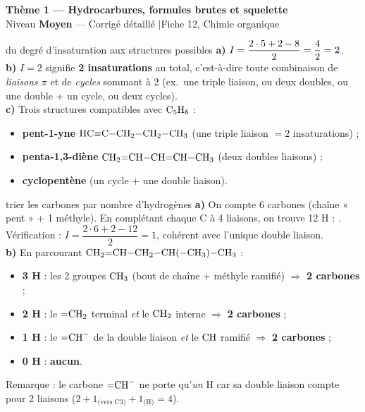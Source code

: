 \documentclass[11pt,a4paper]{article}
\newcommand{\rep}[1]{\textcolor{primarydark}{\textbf{#1}}}
\newcommand{\banner}[2]{%
\begin{tcolorbox}[enhanced,colback=excol,colframe=excol,arc=5pt,boxrule=0pt,
   left=5mm,right=5mm,top=2.5mm,bottom=2.5mm,coltext=white]
{\large\bfseries #1}\\[1pt]{\small #2}
\end{tcolorbox}\vspace{2pt}}
\begin{document}
\banner{Thème 1 — Hydrocarbures, formules brutes et squelette}{Niveau \textbf{Moyen} — Corrigé détaillé \quad$\vert$\quad Fiche 12, Chimie organique}

\begin{corr}{du degré d'insaturation aux structures possibles}
\textbf{a)} $I=\dfrac{2\cdot5+2-8}{2}=\dfrac{4}{2}=\rep{2}$.\\
\textbf{b)} $I=2$ signifie \rep{2 insaturations} au total, c'est-à-dire toute combinaison de \emph{liaisons $\pi$} et de \emph{cycles} sommant à 2 (ex.\ une triple liaison, ou deux doubles, ou une double + un cycle, ou deux cycles).\\
\textbf{c)} Trois structures compatibles avec $\ce{C5H8}$ :
\begin{itemize}[leftmargin=1.6em,itemsep=1pt]
  \item \rep{pent-1-yne} $\ce{HC#C-CH2-CH2-CH3}$ (une triple liaison $=2$ insaturations) ;
  \item \rep{penta-1,3-diène} $\ce{CH2=CH-CH=CH-CH3}$ (deux doubles liaisons) ;
  \item \rep{cyclopentène} (un cycle + une double liaison).
\end{itemize}
\end{corr}

\begin{corr}{trier les carbones par nombre d'hydrogènes}
\textbf{a)} On compte 6 carbones (chaîne « pent » + 1 méthyle). En complétant chaque C à 4 liaisons, on trouve 12 H : \rep{}. Vérification : $I=\dfrac{2\cdot6+2-12}{2}=1$, cohérent avec l'unique double liaison.\\
\textbf{b)} En parcourant $\ce{CH2}{=}\ce{CH}{-}\ce{CH2}{-}\ce{CH}({-}\ce{CH3}){-}\ce{CH3}$ :
\begin{itemize}[leftmargin=1.6em,itemsep=1pt]
  \item \rep{3 H} : les 2 groupes $\ce{CH3}$ (bout de chaîne + méthyle ramifié) $\Rightarrow$ \rep{2 carbones} ;
  \item \rep{2 H} : le $\ce{=CH2}$ terminal \emph{et} le $\ce{CH2}$ interne $\Rightarrow$ \rep{2 carbones} ;
  \item \rep{1 H} : le $\ce{=CH-}$ de la double liaison \emph{et} le $\ce{CH}$ ramifié $\Rightarrow$ \rep{2 carbones} ;
  \item \rep{0 H} : \rep{aucun}.
\end{itemize}
Remarque : le carbone $\ce{=CH-}$ ne porte qu'\emph{un} H car sa double liaison compte pour 2 liaisons ($2+1_{\text{(vers C3)}}+1_{\text{(H)}}=4$).
\end{corr}
\end{document}
